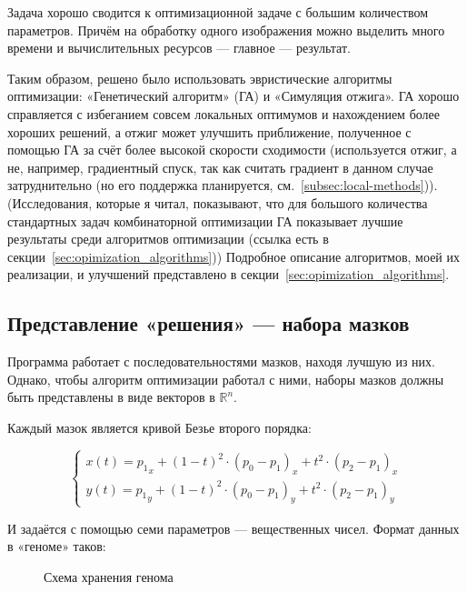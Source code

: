 Задача хорошо сводится к оптимизационной задаче с большим количеством параметров.
Причём на обработку одного изображения можно выделить много времени и вычислительных ресурсов — главное — результат.

Таким образом, решено было использовать эвристические алгоритмы оптимизации:
«Генетический алгоритм» (ГА) и «Симуляция отжига».
ГА хорошо справляется с избеганием совсем локальных оптимумов и нахождением более хороших решений,
а отжиг может улучшить приближение, полученное с помощью ГА за счёт более высокой скорости сходимости
(используется отжиг, а не, например, градиентный спуск, так как считать градиент в данном случае затруднительно
(но его поддержка планируется, см.~\ref{subsec:local-methods})).
(Исследования, которые я читал, показывают, что для большого количества стандартных задач комбинаторной оптимизации
ГА показывает лучшие результаты среди алгоритмов оптимизации (ссылка есть в секции~\ref{sec:opimization_algorithms}))
Подробное описание алгоритмов, моей их реализации, и улучшений представлено в секции~\ref{sec:opimization_algorithms}.


\subsection{Представление «решения»  — набора мазков}
Программа работает с последовательностями мазков, находя лучшую из них.
Однако, чтобы алгоритм оптимизации работал с ними, наборы мазков должны быть представлены в виде векторов в $\mathbb{R}^n$.

Каждый мазок является кривой Безье второго порядка:

\begin{equation}\label{eq:bezier_curve}
    \begin{cases}
        x(t) = {p_1}_x + (1 - t)^2 \cdot (p_0 - p_1)_x + t^2 \cdot (p_2 - p_1)_x \\
        y(t) = {p_1}_y + (1 - t)^2 \cdot (p_0 - p_1)_y + t^2 \cdot (p_2 - p_1)_y
    \end{cases}
\end{equation}

И задаётся с помощью семи параметров — вещественных чисел.
Формат данных в «геноме» таков:

\begin{figure}[h!]
    \centering
    \caption{Схема хранения генома}
    \label{fig:genome_contents_table}
\end{figure}
\FloatBarrier


